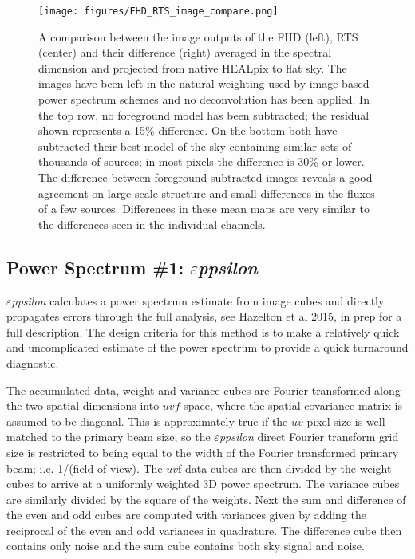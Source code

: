 \documentclass[twolcolumn,iop]{emulateapj}
\def\eppsilon{{\it $\varepsilon$ppsilon}}
\def\eppsiloncite{Hazelton et al 2015, in prep}
\begin{document}
\begin{figure}[htb]
\begin{center}
\texttt{[image: figures/FHD\_RTS\_image\_compare.png]}
\caption{A comparison between the image outputs of the FHD (left), RTS (center) and their difference (right) averaged in the spectral dimension and projected from native HEALpix to flat sky. The images have been left in the natural weighting used by image-based power spectrum schemes and no deconvolution has been applied.   In the top row, no foreground model has been subtracted; the residual shown represents a 15\% difference. On the bottom both have subtracted their best model of the sky containing similar sets of thousands of sources; in most pixels the difference is 30\% or lower.   The difference between foreground subtracted images reveals a good agreement on large scale structure and small differences in the fluxes of a few sources. Differences in these mean maps are very similar to the differences seen in the individual channels.
\label{fig:image_compare}}
\end{center}
\end{figure}


\subsection{Power Spectrum \#1: \eppsilon}
\label{sec:EPPSILON}
\eppsilon{} calculates a power spectrum estimate from image cubes and
directly propagates errors through the full analysis, see \eppsiloncite{} for a full description. The design criteria for this method is to make a relatively quick and uncomplicated estimate of the power spectrum to provide a quick turnaround diagnostic. 


The accumulated data, weight and variance cubes are Fourier transformed along the two spatial dimensions into $uvf$ space, where the spatial covariance matrix is assumed to be diagonal. This is approximately true if the $uv$ pixel size is well matched to the primary beam size, so the  \eppsilon{} direct Fourier transform grid size is restricted to being equal to the width of the Fourier transformed primary beam; i.e. 1/(field of view). The $uv$f data cubes are then divided by the weight cubes to arrive at a uniformly weighted 3D power spectrum. The variance cubes are similarly divided by the square of the weights. Next the sum and difference of the even and odd cubes are computed with variances given by adding the reciprocal of the even and odd variances in quadrature. The difference cube then contains only noise  and the sum cube contains both sky signal and noise.
\end{document}
